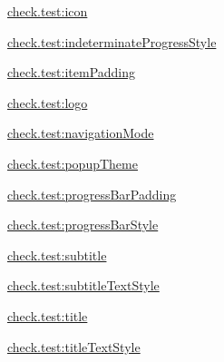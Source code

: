 {\ttfamily \hyperlink{classcheck_1_1test_1_1_r_1_1styleable_a59d128f0d74801dcc8e66e1748460fed}{check.\+test\+:icon}}

{\ttfamily \hyperlink{classcheck_1_1test_1_1_r_1_1styleable_aa15c171a89aa6949c69bf05ac296389c}{check.\+test\+:indeterminate\+Progress\+Style}}

{\ttfamily \hyperlink{classcheck_1_1test_1_1_r_1_1styleable_a1e919ff125d9a130e6515a258bc0ebbd}{check.\+test\+:item\+Padding}}

{\ttfamily \hyperlink{classcheck_1_1test_1_1_r_1_1styleable_ac94a2b6df672cef0c246aff7b6bfaa23}{check.\+test\+:logo}}

{\ttfamily \hyperlink{classcheck_1_1test_1_1_r_1_1styleable_a52cd104b62a9b6372ea39bd7da78cb1b}{check.\+test\+:navigation\+Mode}}

{\ttfamily \hyperlink{classcheck_1_1test_1_1_r_1_1styleable_a50824fb411f147909363103d29b2ac25}{check.\+test\+:popup\+Theme}}

{\ttfamily \hyperlink{classcheck_1_1test_1_1_r_1_1styleable_a535160a98b5036d981b4bc255935336a}{check.\+test\+:progress\+Bar\+Padding}}

{\ttfamily \hyperlink{classcheck_1_1test_1_1_r_1_1styleable_a3789f8c4018be856bcd214951aadcb71}{check.\+test\+:progress\+Bar\+Style}}

{\ttfamily \hyperlink{classcheck_1_1test_1_1_r_1_1styleable_a84729c20d79b553693df4d068f7a3ceb}{check.\+test\+:subtitle}}

{\ttfamily \hyperlink{classcheck_1_1test_1_1_r_1_1styleable_ad8f744ed2471b251e30b55ec1193a048}{check.\+test\+:subtitle\+Text\+Style}}

{\ttfamily \hyperlink{classcheck_1_1test_1_1_r_1_1styleable_a9f68b2ef978d31096a2c231b92d807bc}{check.\+test\+:title}}

{\ttfamily \hyperlink{classcheck_1_1test_1_1_r_1_1styleable_a35a91b9015c202578382afcbaba1eab6}{check.\+test\+:title\+Text\+Style}}

